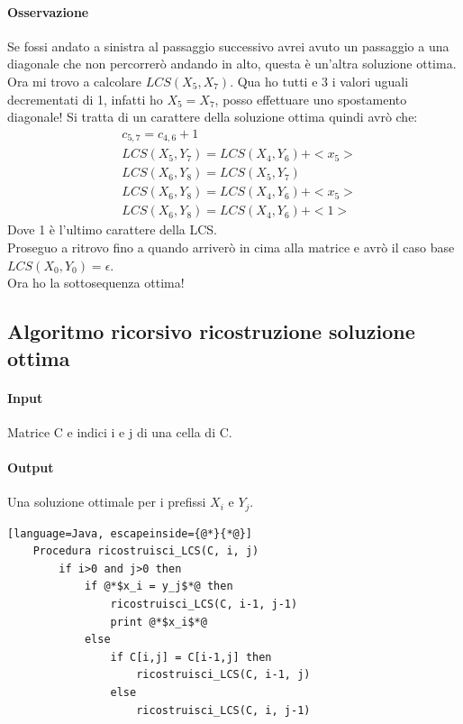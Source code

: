 \paragraph*{Osservazione} Se fossi andato a sinistra al passaggio successivo avrei avuto un passaggio a una 
diagonale che non percorrerò andando in alto, questa è un'altra soluzione ottima.\\
Ora mi trovo a calcolare $LCS(X_5, X_7)$. Qua ho tutti e 3 i valori uguali decrementati di 1, infatti ho $X_5 = X_7$,
posso effettuare uno spostamento diagonale! Si tratta di un carattere della soluzione ottima quindi avrò che:
\begin{align*}
    &c_{5,7} = c_{4,6} + 1\\
    &LCS(X_5,Y_7) = LCS(X_4, Y_6) + <x_5>\\
    &LCS(X_6,Y_8) = LCS(X_5,Y_7)\\
    &LCS(X_6,Y_8) = LCS(X_4,Y_6) + <x_5>\\
    &LCS(X_6,Y_8) = LCS(X_4,Y_6) + <1>
\end{align*}
Dove 1 è l'ultimo carattere della LCS.\\
Proseguo a ritrovo fino a quando arriverò in cima alla matrice e avrò il caso base $LCS(X_0, Y_0) = \epsilon$.\\
Ora ho la sottosequenza ottima!\\
\subsection{Algoritmo ricorsivo ricostruzione soluzione ottima}
\paragraph*{Input} Matrice C e indici i e j di una cella di C.
\paragraph*{Output} Una soluzione ottimale per i prefissi $X_i$ e $Y_j$.
\begin{lstlisting}[language=Java, escapeinside={@*}{*@}]
    Procedura ricostruisci_LCS(C, i, j)
        if i>0 and j>0 then
            if @*$x_i = y_j$*@ then
                ricostruisci_LCS(C, i-1, j-1)
                print @*$x_i$*@
            else
                if C[i,j] = C[i-1,j] then
                    ricostruisci_LCS(C, i-1, j)
                else
                    ricostruisci_LCS(C, i, j-1)
\end{lstlisting}
